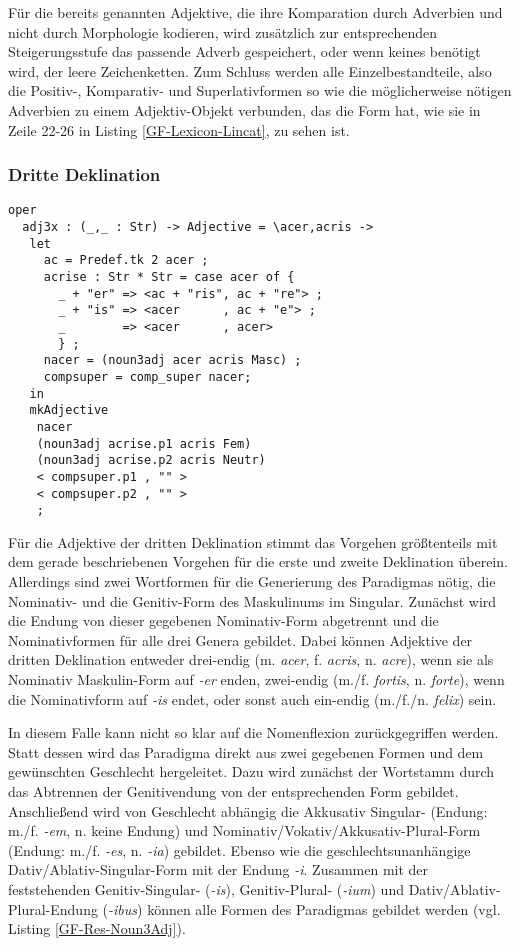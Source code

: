 Für die bereits genannten Adjektive, die ihre Komparation durch Adverbien und nicht durch Morphologie kodieren, wird zusätzlich zur entsprechenden Steigerungsstufe das passende Adverb gespeichert, oder wenn keines benötigt wird, der leere Zeichenketten. 
Zum Schluss werden alle Einzelbestandteile, also die Positiv-, Komparativ- und Superlativformen so wie die möglicherweise nötigen Adverbien zu einem Adjektiv-Objekt verbunden, das die Form hat, wie sie in Zeile 22-26 in Listing \ref{GF-Lexicon-Lincat}, zu sehen ist.\par
\FloatBarrier
\subsubsection{Dritte Deklination}
\begin{lstlisting}[float=h!tp,caption={Deklinationsfunktion für zwei- und drei-endige Adjektive der dritten Deklination (vgl. \textbf{MorphoLat.gf})},label={GF-Morpho-Adj3x},basicstyle=\small]
oper
  adj3x : (_,_ : Str) -> Adjective = \acer,acris ->
   let
     ac = Predef.tk 2 acer ;
     acrise : Str * Str = case acer of {
       _ + "er" => <ac + "ris", ac + "re"> ; 
       _ + "is" => <acer      , ac + "e"> ;
       _        => <acer      , acer> 
       } ;
     nacer = (noun3adj acer acris Masc) ;
     compsuper = comp_super nacer;
   in
   mkAdjective 
    nacer
    (noun3adj acrise.p1 acris Fem) 
    (noun3adj acrise.p2 acris Neutr) 
    < compsuper.p1 , "" >
    < compsuper.p2 , "" >
    ;
\end{lstlisting}
Für die Adjektive der dritten Deklination stimmt das Vorgehen größtenteils mit dem gerade beschriebenen Vorgehen für die erste und zweite Deklination überein. Allerdings sind zwei Wortformen für die Generierung des Paradigmas nötig, die Nominativ- und die Genitiv-Form des Maskulinums im Singular. Zunächst wird die Endung von dieser gegebenen Nominativ-Form abgetrennt und die Nominativformen für alle drei Genera gebildet. Dabei können Adjektive der dritten Deklination entweder drei-endig (m. \textit{acer}, f. \textit{acris}, n. \textit{acre}), wenn sie als Nominativ Maskulin-Form auf \textit{-er} enden, zwei-endig (m./f. \textit{fortis}, n. \textit{forte}), wenn die Nominativform auf \textit{-is} endet, oder sonst auch ein-endig (m./f./n. \textit{felix}) sein. \par
In diesem Falle kann nicht so klar auf die Nomenflexion zurückgegriffen werden. Statt dessen wird das Paradigma direkt aus zwei gegebenen Formen und dem gewünschten Geschlecht hergeleitet. Dazu wird zunächst der Wortstamm durch das Abtrennen der Genitivendung von der entsprechenden Form gebildet. Anschließend wird von Geschlecht abhängig die Akkusativ Singular- (Endung: m./f. \textit{-em}, n. keine Endung) und Nominativ/Vokativ/Akkusativ-Plural-Form (Endung: m./f. \textit{-es}, n. \textit{-ia}) gebildet. Ebenso wie die geschlechtsunanhängige Dativ/Ablativ-Singular-Form mit der Endung \textit{-i}. Zusammen mit der feststehenden Genitiv-Singular- (\textit{-is}), Genitiv-Plural- (\textit{-ium}) und Dativ/Ablativ-Plural-Endung (\textit{-ibus}) können alle Formen des Paradigmas gebildet werden (vgl. Listing \ref{GF-Res-Noun3Adj}).\par
